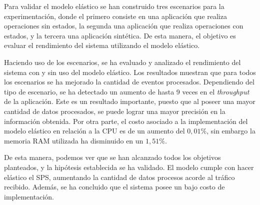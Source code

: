 Para validar el modelo elástico se \normalsize{han} construido tres escenarios para la experimentación, donde el \normalsize{primero} consiste en una aplicación que realiza operaciones sin estados, la segunda una aplicación que realiza operaciones con estados, y la tercera una aplicación sintética. De esta manera, el objetivo es evaluar el rendimiento del sistema utilizando el modelo elástico.


Haciendo uso de los escenarios, se ha evaluado y analizado el rendimiento del sistema con y sin uso del modelo elástico. Los resultados muestran que para todos los escenarios se ha mejorado la cantidad de eventos procesados. Dependiendo del tipo de escenario, se ha detectado un aumento de hasta 9 veces en el \textit{throughput} de la aplicación. Este es un resultado importante, puesto que al poseer una mayor cantidad de datos procesados, se puede lograr una mayor precisión en la información obtenida. Por otra parte, el costo asociado a la implementación del modelo elástico en relación a la CPU es de un aumento del $0,01\%$, sin embargo la memoria RAM utilizada ha disminuido en un $1,51\%$.


De esta manera, podemos ver que se han alcanzado todos los objetivos planteados, y la hipótesis establecida se ha validado. El modelo cumple con hacer elástico el SPS, aumentando la cantidad de datos procesos acorde al tráfico recibido. Además, se ha concluido que el sistema posee un bajo costo de implementación.

